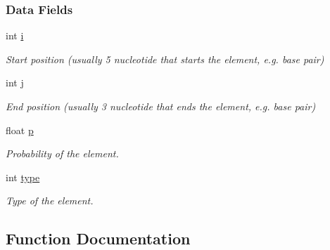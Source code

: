 \subsubsection*{Data Fields}
\begin{DoxyCompactItemize}
\item 
\mbox{\label{group__struct__utils__plist_a0f8bb11ded4e605f816d7ad92eb568f6}} 
int \hyperlink{group__struct__utils__plist_a0f8bb11ded4e605f816d7ad92eb568f6}{i}
\begin{DoxyCompactList}\small\item\em Start position (usually 5\textquotesingle{} nucleotide that starts the element, e.\+g. base pair) \end{DoxyCompactList}\item 
\mbox{\label{group__struct__utils__plist_acada5be62ed6843334a918ca543f0c0d}} 
int \hyperlink{group__struct__utils__plist_acada5be62ed6843334a918ca543f0c0d}{j}
\begin{DoxyCompactList}\small\item\em End position (usually 3\textquotesingle{} nucleotide that ends the element, e.\+g. base pair) \end{DoxyCompactList}\item 
\mbox{\label{group__struct__utils__plist_a9c09385582d8a7ab00485181f4e868b7}} 
float \hyperlink{group__struct__utils__plist_a9c09385582d8a7ab00485181f4e868b7}{p}
\begin{DoxyCompactList}\small\item\em Probability of the element. \end{DoxyCompactList}\item 
\mbox{\label{group__struct__utils__plist_a11715ffa51cb6277db7ebd3d9170d691}} 
int \hyperlink{group__struct__utils__plist_a11715ffa51cb6277db7ebd3d9170d691}{type}
\begin{DoxyCompactList}\small\item\em Type of the element. \end{DoxyCompactList}\end{DoxyCompactItemize}


\subsection{Function Documentation}
\mbox{\label{group__struct__utils__plist_gaf002d69024d709744664a8b9ca3dd77d}} 
